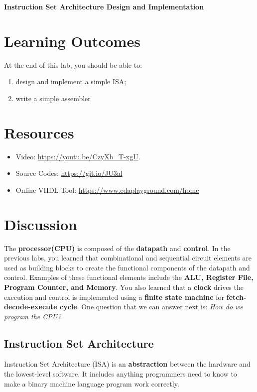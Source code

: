 \documentclass[a4paper, 11pt,oneside]{article}
\begin{document}
\begin{center}
	{\LARGE \textbf{Instruction Set Architecture Design and Implementation}}
\end{center}

\section*{Learning Outcomes}
   At the end of this lab, you should be able to:
   \begin{enumerate}[itemsep=0pt,parsep=0pt]
   	   \item design and implement a simple ISA;
       \item write a simple assembler
   \end{enumerate}   
\tableofcontents

\section{Resources}
\begin{itemize}
	\item Video: \href{https://youtu.be/CzyXb_T-xgU}{https://youtu.be/CzyXb\_T-xgU}.
	\item Source Codes: \href{https://git.io/JU3al}{https://git.io/JU3al}
	\item Online VHDL Tool: \href{https://www.edaplayground.com/home}
	{https://www.edaplayground.com/home}
\end{itemize}	

\section{Discussion}
The \textbf{processor(CPU)} is composed of the \textbf{datapath} and 
\textbf{control}. In the previous labs, you learned that combinational and 
sequential circuit elements are used as building blocks to create the 
functional components of the datapath and control. Examples of these functional 
elements include the \textbf{ALU, Register File, Program Counter, and Memory}. 
You also learned that a \textbf{clock} drives the execution and control is 
implemented using a \textbf{finite state machine} for 
\textbf{fetch-decode-execute cycle}. One question that we can answer next is: 
\textit{How do we program the CPU?}


\subsection{Instruction Set Architecture}
Instruction Set Architecture (ISA) is an \textbf{abstraction} between the 
hardware and the lowest-level software. It includes anything programmers need 
to know to make a binary machine language program work correctly.
\end{document}
